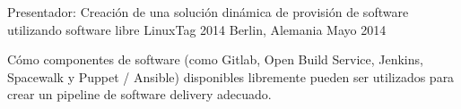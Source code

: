 \begin{cventries}
{\begin{cvitems}
      \end{cvitems}
    }
  \cventry
    {Presentador: Creación de una solución dinámica de provisión de software utilizando software libre}
    {LinuxTag 2014} %
    {Berlin, Alemania} %
    {Mayo 2014} %
    {
      \begin{cvitems} %
      \item {Cómo componentes de software (como Gitlab, Open Build Service, Jenkins, Spacewalk y Puppet / Ansible) disponibles libremente pueden ser utilizados para crear un pipeline de software delivery adecuado.}
      \end{cvitems}
    }

\end{cventries}
